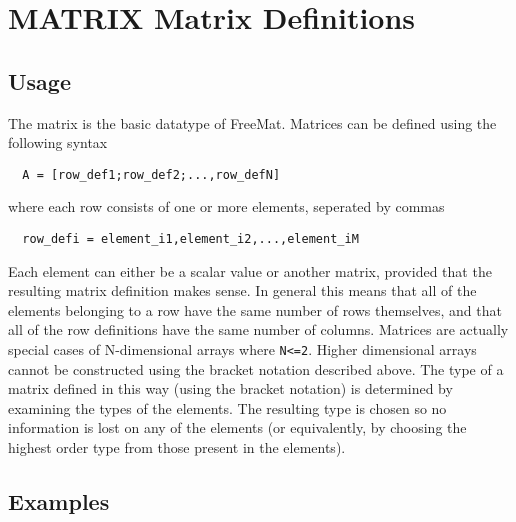 \section{MATRIX Matrix Definitions}

\subsection{Usage}

The matrix is the basic datatype of FreeMat.  Matrices can be
defined using the following syntax
\begin{verbatim}
  A = [row_def1;row_def2;...,row_defN]
\end{verbatim}
where each row consists of one or more elements, seperated by
commas
\begin{verbatim}
  row_defi = element_i1,element_i2,...,element_iM
\end{verbatim}
Each element can either be a scalar value or another matrix,
provided that the resulting matrix definition makes sense.
In general this means that all of the elements belonging
to a row have the same number of rows themselves, and that
all of the row definitions have the same number of columns.
Matrices are actually special cases of N-dimensional arrays
where \verb|N<=2|.  Higher dimensional arrays cannot be constructed
using the bracket notation described above.  The type of a
matrix defined in this way (using the bracket notation) is
determined by examining the types of the elements.  The resulting
type is chosen so no information is lost on any of the elements
(or equivalently, by choosing the highest order type from those
present in the elements).
\subsection{Examples}

